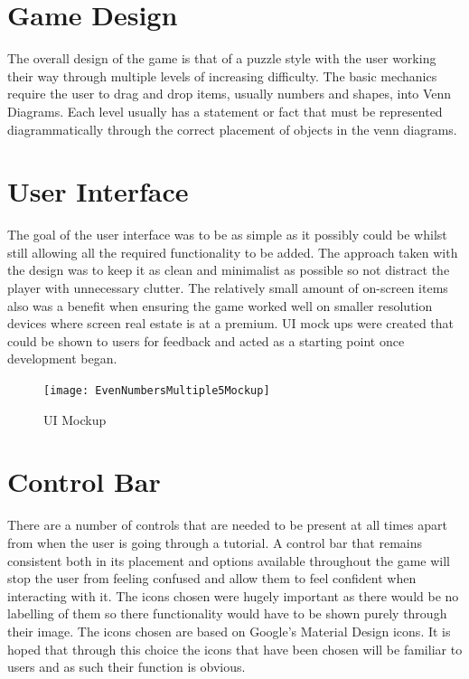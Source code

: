 \documentclass[12pt,a4paper]{report}
\begin{document}
\section{Game Design}
The overall design of the game is that of a puzzle style with the user working their way through multiple levels of increasing difficulty. The basic mechanics require the user to drag and drop items, usually numbers and shapes, into Venn Diagrams. Each level usually has a statement or fact that must be represented diagrammatically through the correct placement of objects in the venn diagrams.

\section{User Interface}
The goal of the user interface was to be as simple as it possibly could be whilst still allowing all the required functionality to be added. The approach taken with the design was to keep it as clean and minimalist as possible so not distract the player with unnecessary clutter. The relatively small amount of on-screen items also was a benefit when ensuring the game worked well on smaller resolution devices where screen real estate is at a premium. UI mock ups were created that could be shown to users for feedback and acted as a starting point once development began.

\begin{figure}[h]
  \centering
  \begin{minipage}[b]{1\textwidth}
    \texttt{[image: EvenNumbersMultiple5Mockup]}
    \caption{UI Mockup}
  \end{minipage}
\end{figure}
\FloatBarrier

\section{Control Bar}
There are a number of controls that are needed to be present at all times apart from when the user is going through a tutorial. A control bar that remains consistent both in its placement and options available throughout the game will stop the user from feeling confused and allow them to feel confident when interacting with it. The icons chosen were hugely important as there would be no labelling of them so there functionality would have to be shown purely through their image. The icons chosen are based on Google's Material Design icons. It is hoped that through this choice the icons that have been chosen will be familiar to users and as such their function is obvious.
\end{document}

